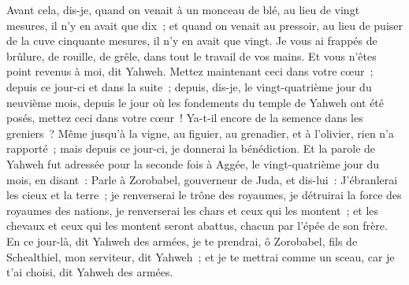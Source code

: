 \begin{multicols}{2}
Avant cela, dis-je, quand on venait à un monceau de blé, au lieu de vingt mesures, il n'y en avait que dix~; et quand on  venait au pressoir, au lieu de puiser de la cuve cinquante mesures, il n'y en avait que vingt.
Je vous ai frappés de brûlure, de rouille, de grêle, dans tout le travail de vos mains. Et vous n'êtes point revenus à moi, dit Yahweh.
Mettez maintenant ceci dans votre cœur~; depuis ce jour-ci et dans la suite~; depuis, dis-je, le vingt-quatrième jour du neuvième mois, depuis le jour où les fondements du temple de Yahweh ont été posés, mettez ceci dans votre cœur~!
Ya-t-il encore de la semence dans les greniers~? Même jusqu'à la vigne, au figuier, au grenadier, et à l'olivier, rien n'a rapporté~; mais depuis ce jour-ci, je donnerai la bénédiction.
Et la parole de Yahweh fut adressée pour la seconde fois à Aggée, le vingt-quatrième jour du mois, en disant~:
Parle à Zorobabel, gouverneur de Juda, et dis-lui~: J'ébranlerai les cieux et la terre~;
je renverserai le trône des royaumes, je détruirai la force des royaumes des nations, je renverserai les chars et ceux qui les montent~; et les chevaux et ceux qui les montent seront abattus, chacun par l'épée de son frère.
En ce jour-là, dit Yahweh des armées, je te prendrai, ô Zorobabel, fils de Schealthiel, mon serviteur, dit Yahweh~; et je te mettrai comme un sceau, car je t'ai choisi, dit Yahweh des armées.
\PPE{}
\end{multicols}
